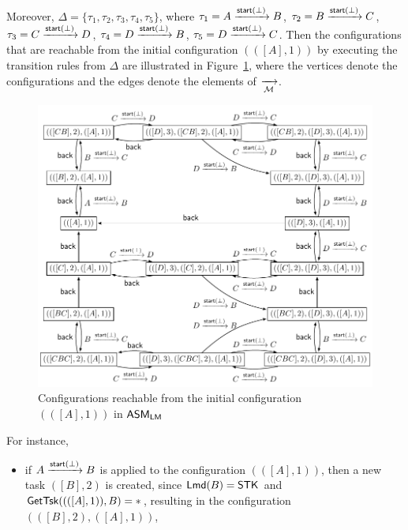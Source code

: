 \begin{example}
		Moreover, $\Delta = \{\tau_1, \tau_2, \tau_3, \tau_4, \tau_5\}$, where 
		$\tau_1 = A \xrightarrow{{\mathsf{start} }(\bot)} B$,
		$\tau_2 = B \xrightarrow{{\mathsf{start} }(\bot)} C$,
		$\tau_3 = C \xrightarrow{{\mathsf{start} }(\bot)} D$,
		$\tau_4 = D \xrightarrow{{\mathsf{start} }(\bot)} B$,
		$\tau_5 = D \xrightarrow{{\mathsf{start} }(\bot)} C$.
		Then the configurations that are reachable from the initial configuration $(([A], 1))$ by executing the transition rules from $\Delta$ are illustrated in Figure~\ref{lmasm-example}, where the vertices denote the configurations and the edges denote the elements of $\xrightarrow[{\mathcal{M} }]{}$. 
		\begin{figure}[t]
			\centering
			\includegraphics[scale = 0.75]{lmasm-example.pdf}
			\caption{Configurations reachable from the initial configuration $(([A], 1))$ in $\textsf{ASM}_\textsf{LM}$}
			\label{lmasm-example}
		\end{figure}
		For instance, 
		\begin{itemize}
			\item if $A \xrightarrow{{\mathsf{start} }(\bot)} B$ is applied to the configuration $(([A], 1))$, then a new task $([B],2)$ is created, since ${\sf Lmd}(B) = \mathsf{STK}$ and $\mathsf{GetTsk}((([A],1)), B) = *$, resulting in the configuration $(([B],2),([A],1))$,

\end{itemize}
\end{example}
